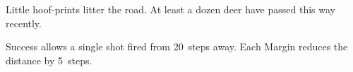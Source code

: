 \begin{boxtext}
  Little hoof-prints litter the road.  At least a dozen deer have passed this
  way recently.
\end{boxtext}

Success allows a single shot fired from 20~\glspl{step} away.  Each Margin
reduces the distance by 5~\glspl{step}.


